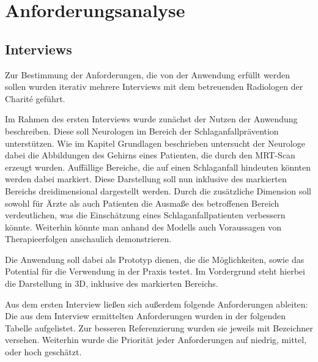 
\chapter{Anforderungsanalyse}
\label{anforderung}

\section{Interviews}

Zur Bestimmung der Anforderungen, die von der Anwendung erfüllt werden sollen wurden iterativ mehrere Interviews mit dem betreuenden Radiologen der Charité geführt.


Im Rahmen des ersten Interviews wurde zunächst der Nutzen der Anwendung beschreiben.
Diese soll Neurologen im Bereich der Schlaganfallprävention unterstützen. Wie im Kapitel Grundlagen beschrieben untersucht der Neurologe dabei die Abbildungen des Gehirns eines Patienten, die durch den MRT-Scan erzeugt wurden. Auffällige Bereiche, die auf einen Schlaganfall hindeuten könnten werden dabei markiert. 
Diese Darstellung soll nun inklusive des markierten Bereichs dreidimensional dargestellt werden. Durch die zusätzliche Dimension soll sowohl für Ärzte als auch Patienten die Ausmaße des betroffenen Bereich verdeutlichen, was die Einschätzung eines Schlaganfallpatienten verbessern könnte.
Weiterhin könnte man anhand des Modells auch Voraussagen von Therapieerfolgen anschaulich demonstrieren.

Die Anwendung soll dabei als Prototyp dienen, die die Möglichkeiten, sowie das Potential für die Verwendung in der Praxis testet. Im Vordergrund steht hierbei die Darstellung in 3D, inklusive des markierten Bereichs.

Aus dem ersten Interview ließen sich außerdem folgende Anforderungen ableiten:
Die aus dem Interview ermittelten Anforderungen wurden in der folgenden Tabelle aufgelistet. Zur besseren Referenzierung wurden sie jeweils mit Bezeichner versehen. Weiterhin wurde die Priorität jeder Anforderungen auf niedrig, mittel, oder hoch geschätzt.

